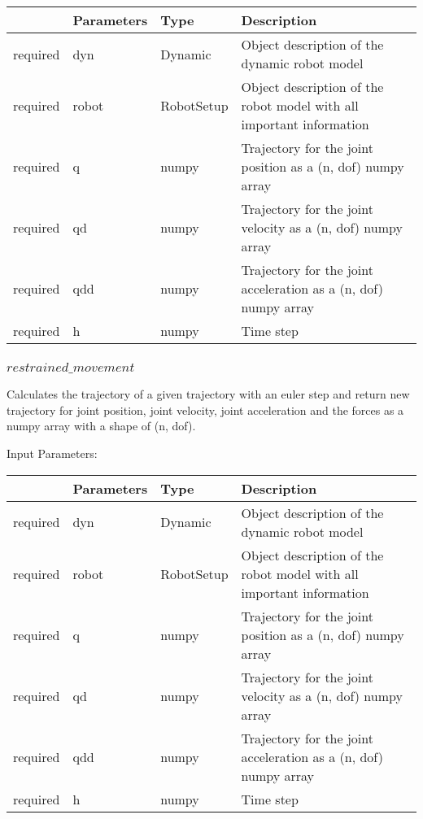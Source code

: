 \documentclass[
	ngerman,
	accentcolor=9c,%
	type=intern,
	marginpar=false
	]{tudapub}
\begin{document}
\begin{tabular}{|p{}|p{}|p{}| p{}|}
\hline
 & \textbf{Parameters} & \textbf{Type} & \textbf{Description} \\
\hline
required & dyn & Dynamic & Object description of the dynamic robot model \\
\hline
required & robot & RobotSetup & Object description of the robot model with all important information \\
\hline
required & q & numpy & Trajectory for the joint position as a (n, dof) numpy array \\
\hline
required & qd & numpy & Trajectory for the joint velocity as a (n, dof) numpy array \\
\hline
required & qdd & numpy & Trajectory for the joint acceleration as a (n, dof) numpy array \\
\hline
required & h & numpy & Time step \\
\hline
\end{tabular}
\vspace{1cm}


\subsubsection{$restrained\_movement$}
\noindent Calculates the trajectory of a given trajectory with an euler step and return new trajectory for joint position, joint velocity, joint acceleration and the forces as a numpy array with a shape of (n, dof).

\vspace{0.5cm}
\noindent Input Parameters:
\vspace{0.5cm}

\begin{tabular}{|p{}|p{}|p{}| p{}|}
\hline
 & \textbf{Parameters} & \textbf{Type} & \textbf{Description} \\
\hline
required & dyn & Dynamic & Object description of the dynamic robot model \\
\hline
required & robot & RobotSetup & Object description of the robot model with all important information \\
\hline
required & q & numpy & Trajectory for the joint position as a (n, dof) numpy array \\
\hline
required & qd & numpy & Trajectory for the joint velocity as a (n, dof) numpy array \\
\hline
required & qdd & numpy & Trajectory for the joint acceleration as a (n, dof) numpy array \\
\hline
required & h & numpy & Time step \\
\hline
\end{tabular}
\vspace{1cm}
\end{document}
